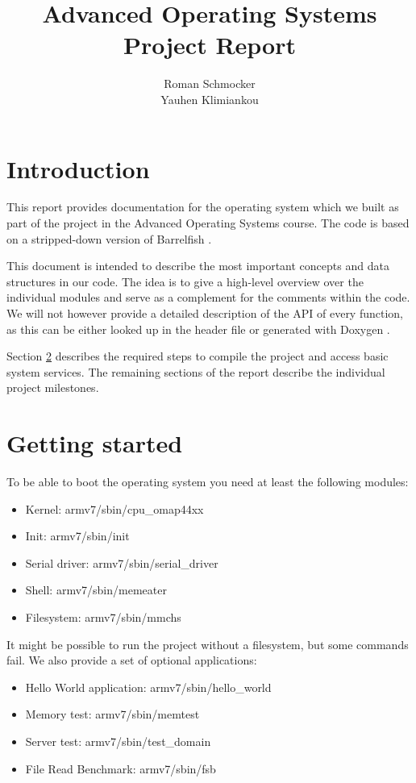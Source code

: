 \documentclass[a4paper,10pt]{article}
\title{Advanced Operating Systems \\ Project Report}
\author{Roman Schmocker \\ Yauhen Klimiankou}
\begin{document}
\maketitle


\section{Introduction}

This report provides documentation for the operating system which we built as part of the project in the Advanced Operating Systems course.
The code is based on a stripped-down version of Barrelfish \cite {web:barrelfish}.

This document is intended to describe the most important concepts and data structures in our code.
The idea is to give a high-level overview over the individual modules and serve as a complement for the comments within the code.
We will not however provide a detailed description of the API of every function, as this can be either looked up in the header file or generated with Doxygen \cite{web:doxygen}.

Section \ref{sec:getting-started} describes the required steps to compile the project and access basic system services.
The remaining sections of the report describe the individual project milestones.

\section{Getting started}
\label{sec:getting-started}

To be able to boot the operating system you need at least the following modules:
\begin{itemize}
 \item Kernel: armv7/sbin/cpu\_omap44xx
 \item Init: armv7/sbin/init
 \item Serial driver: armv7/sbin/serial\_driver
 \item Shell: armv7/sbin/memeater
 \item Filesystem: armv7/sbin/mmchs
\end{itemize}

It might be possible to run the project without a filesystem, but some commands fail.
We also provide a set of optional applications:
\begin{itemize}
 \item Hello World application: armv7/sbin/hello\_world
 \item Memory test: armv7/sbin/memtest
 \item Server test: armv7/sbin/test\_domain
 \item File Read Benchmark: armv7/sbin/fsb
\end{itemize}
\end{document}

